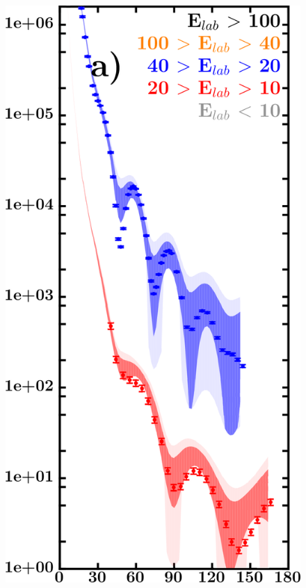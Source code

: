 \documentclass[twocolumn,secnumarabic,amssymb, nobibnotes, aps, prl,
superscriptaddress, nobalancelastpage, draft]{revtex4}
\begin{document}
\begin{figure}[!htb]
    \centering
    \begin{minipage}{0.4\linewidth}
        \centering
        \begin{minipage}[c]{0.5\linewidth}
            \centering
                \includegraphics[width=\linewidth]{figures/sn112_protonElastic.png}

\end{minipage}
\end{minipage}
\end{figure}
\end{document}
